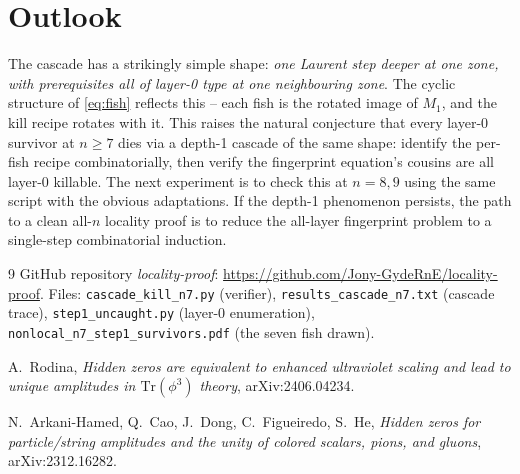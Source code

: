 \documentclass[11pt]{article}
\theoremstyle{definition}
\begin{document}
\section{Outlook}

The cascade has a strikingly simple shape: \emph{one Laurent step deeper
at one zone, with prerequisites all of layer-0 type at one neighbouring
zone}. The cyclic structure of \eqref{eq:fish} reflects this -- each
fish is the rotated image of $M_1$, and the kill recipe rotates with
it. This raises the natural conjecture that every layer-0 survivor at
$n\ge 7$ dies via a depth-1 cascade of the same shape: identify the
per-fish recipe combinatorially, then verify the fingerprint equation's
cousins are all layer-0 killable. The next experiment is to check this
at $n=8,9$ using the same script with the obvious adaptations. If the
depth-1 phenomenon persists, the path to a clean all-$n$ locality proof
is to reduce the all-layer fingerprint problem to a single-step
combinatorial induction.

\begin{thebibliography}{9}
GitHub repository \emph{locality-proof}:
\url{https://github.com/Jony-GydeRnE/locality-proof}.
Files: \texttt{cascade\_kill\_n7.py} (verifier),
\texttt{results\_cascade\_n7.txt} (cascade trace),
\texttt{step1\_uncaught.py} (layer-0 enumeration),
\texttt{nonlocal\_n7\_step1\_survivors.pdf} (the seven fish drawn).

A.\ Rodina, \emph{Hidden zeros are equivalent to enhanced ultraviolet
scaling and lead to unique amplitudes in $\mathrm{Tr}(\phi^3)$ theory},
arXiv:2406.04234.

N.\ Arkani-Hamed, Q.\ Cao, J.\ Dong, C.\ Figueiredo, S.\ He,
\emph{Hidden zeros for particle/string amplitudes and the unity of
colored scalars, pions, and gluons}, arXiv:2312.16282.
\end{thebibliography}
\end{document}
